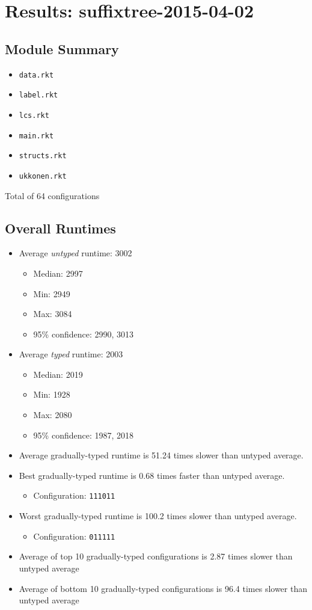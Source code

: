 \documentclass{article}
\newcommand{\mono}[1]{\texttt{#1}}
\begin{document}
\section{Results: suffixtree-2015-04-02}

\subsection{Module Summary}
\begin{itemize}
\item \mono{data.rkt}
\item \mono{label.rkt}
\item \mono{lcs.rkt}
\item \mono{main.rkt}
\item \mono{structs.rkt}
\item \mono{ukkonen.rkt}\end{itemize}
Total of 64 configurations

\subsection{Overall Runtimes}
\begin{itemize}
\item Average \emph{untyped} runtime: 3002
  \begin{itemize}
  \item Median: 2997
  \item Min: 2949
  \item Max: 3084
  \item 95\% confidence: 2990, 3013
  \end{itemize}
\item Average \emph{typed} runtime: 2003
  \begin{itemize}
  \item Median: 2019
  \item Min: 1928
  \item Max: 2080
  \item 95\% confidence: 1987, 2018
  \end{itemize}
\item Average gradually-typed runtime is 51.24 times slower than untyped average.
\item Best gradually-typed runtime is 0.68 times faster than untyped average.
\begin{itemize}\item Configuration: \mono{111011}\end{itemize}
\item Worst gradually-typed runtime is 100.2 times slower than untyped average.
\begin{itemize}\item Configuration: \mono{011111}\end{itemize}
\item Average of top 10 gradually-typed configurations is 2.87 times slower than untyped average
\item Average of bottom 10 gradually-typed configurations is 96.4 times slower than untyped average
\end{itemize}
\end{document}
